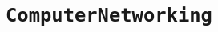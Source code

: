 \newpage
\chapter{\tt Computer\space Networking}
\thispagestyle{fancy}
\renewcommand*{\chaptername}{\tt Computer\space Networking}
\section[\tt TCP/IP]{\color{blue}{\tt TCP/IP}}%
\subsection[{\tt TCP/IP}协议中的三次握手和四次挥手]{}
